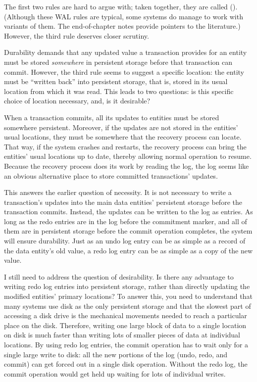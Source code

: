The first two rules are hard to argue with; taken together, they are called
 ().  (Although these WAL
rules are typical, some systems do manage to work with variants of
them.  The end-of-chapter notes provide pointers to the literature.)
However, the third rule deserves closer scrutiny.

Durability demands that any updated value a transaction
provides for an
entity must be stored \emph{somewhere} in persistent storage before
that transaction can commit.  However, the third rule seems to suggest
a specific location: the entity must be ``written back'' into
persistent storage, that is, stored in its usual location from which it
was read.  This leads to two questions: is this specific choice of
location necessary, and, is it desirable?

When a transaction commits, all its updates to entities must be stored
somewhere persistent.  Moreover, if the updates are not stored in the
entities' usual locations, they must be somewhere that the recovery
process can locate.  That way, if the system crashes and restarts, the
recovery process can bring the entities' usual locations up to date,
thereby allowing normal operation to resume.  Because the recovery
process does its work by reading the log, the log seems like an
obvious alternative place to store committed transactions' updates.

This answers the earlier question of necessity.  It is not necessary
to write a transaction's updates into the main data entities'
persistent storage before the transaction commits.  Instead, the
updates can be written to the log as  entries.
As long as the redo entries are in the log before the commitment
marker, and all of them are in persistent storage before the commit
operation completes, the system will ensure durability.
Just as an undo log entry can be as simple as a record of the data
entity's old value, a redo log entry can be as simple as a copy of the
new value.

I still need to address the question of desirability.  Is there any
advantage to writing redo log entries into persistent storage, rather
than directly updating the modified entities' primary locations?  To
answer this, you need to understand that many systems use disk as the
only persistent storage and that the slowest part of accessing a disk
drive is the mechanical movements needed to reach a particular place
on the disk.  Therefore, writing one large block of data to a single
location on disk is much faster than writing lots of smaller pieces of
data at individual locations.  By using redo log entries, the commit
operation has to wait only for a single large write to disk: all the
new portions of the log (undo, redo, and commit) can get forced out in
a single disk operation.  Without the redo log, the commit operation
would get held up waiting for lots of individual writes.

